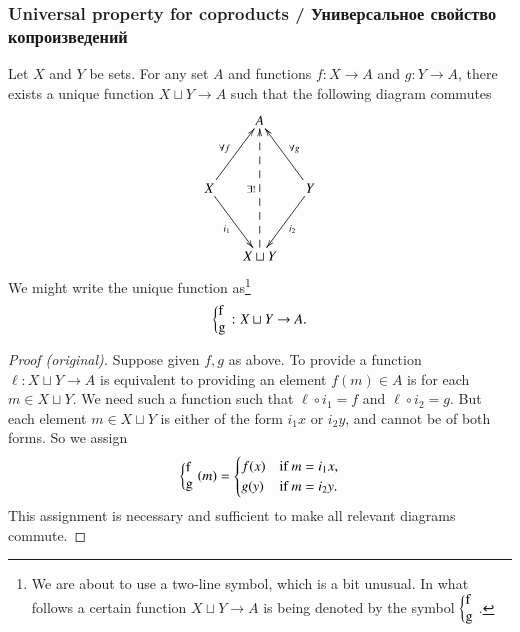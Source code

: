 \documentclass[a4paper]{book}
\def\tn{\textnormal}
\def\to{\rightarrow}
\def\taking{\colon}
\newcommand{\coprodmap}[2]{{\left\{\parbox{.1in}{#1\\#2}\right.}}
\theoremstyle{myth}
\newtheorem{lemmaENG}[envENG]{\begin{english}Lemma\end{english}}
\newenvironment{proofENG}{\begin{proof}[Proof (original)]}{\end{proof}}
\newtheorem{lemmaRUS}[envRUS]{\begin{russian}Лемма\end{russian}}
\newtheorem{exampleRUS}[envRUS]{\begin{russian}Пример\end{russian}}
\begin{document}
\begin{english}
\begin{exampleRUS}\label{ex:coprod of dots}
\begin{russian} \end{russian}
\end{exampleRUS}


\subsubsection{Universal property for coproducts / Универсальное свойство копроизведений}

\begin{lemmaENG}\label{lemma:up for coprod}
Let $X$ and $Y$ be sets. For any set $A$ and functions $f\taking X\to A$ and $g\taking Y\to A$, there exists a unique function $X\sqcup Y\to A$ such that the following diagram commutes
$$
\xymatrix@=15pt{&A\\\\X\ar[uur]^{\forall f}\ar[ddr]_{i_1}&&Y\ar[uul]_{\forall g}\ar[ddl]^{i_2}\\\\&X\sqcup Y\ar@{-->}[uuuu]^{\exists!}}
$$
We might write the unique function as\footnote{We are about to use a two-line symbol, which is a bit unusual. In what follows a certain function $X\sqcup Y\to A$ is being denoted by the symbol $\coprodmap{f}{g}$.}
$$\coprodmap{f}{g}\taking X\sqcup Y\to A.$$
\end{lemmaENG}

\begin{lemmaRUS}\label{lemma:up for coprod}
\begin{russian} \end{russian}
\end{lemmaRUS}

\begin{proofENG}
Suppose given $f,g$ as above. To provide a function $\ell\taking X\sqcup Y\to A$ is equivalent to providing an element $f(m)\in A$ is for each $m\in X\sqcup Y$. We need such a function such that $\ell\circ i_1=f$ and $\ell\circ i_2=g$. But each element $m\in X\sqcup Y$ is either of the form $i_1x$ or $i_2y$, and cannot be of both forms. So we assign 
$$\coprodmap{f}{g}(m)=\begin{cases}f(x)&\tn{if } m=i_1x,\\ g(y) &\tn{if }m=i_2y.\end{cases}$$
This assignment is necessary and sufficient to make all relevant diagrams commute.
\end{proofENG}


\end{english}
\end{document}
